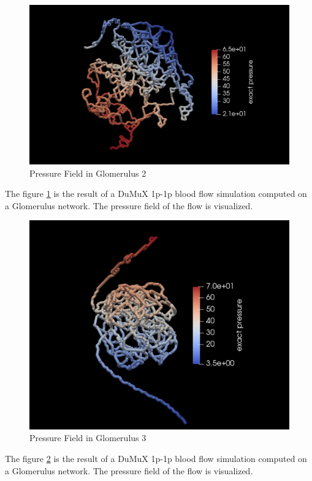 \begin{figure}[h]
\centering
\includegraphics[width=162mm]{nephron2_pressure}
\caption{Pressure Field in Glomerulus 2}
\label{fig:nephron2_pressure}
\end{figure}
The figure \ref{fig:nephron2_pressure} is the result of a DuMuX 1p-1p blood flow simulation computed on a Glomerulus network. The pressure field of the flow is visualized.\\

\begin{figure}[h]
\centering
\includegraphics[width=162mm]{nephron3_pressure}
\caption{Pressure Field in Glomerulus 3}
\label{fig:nephron3_pressure}
\end{figure}
The figure \ref{fig:nephron3_pressure} is the result of a DuMuX 1p-1p blood flow simulation computed on a Glomerulus network. The pressure field of the flow is visualized.\\

